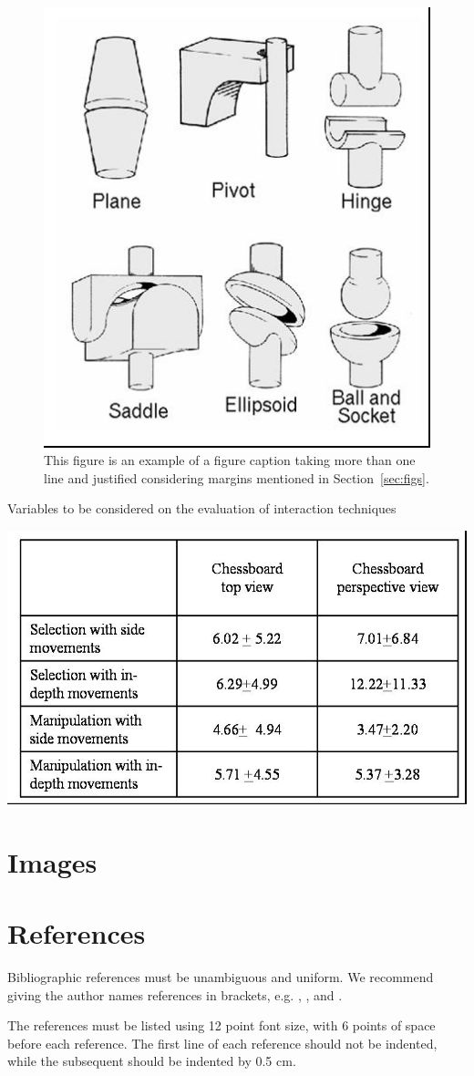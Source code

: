 \documentclass[12pt]{article}
\begin{document}
\begin{figure}[ht]
\centering
\includegraphics[width=.3\textwidth]{fig2.jpg}
\caption{This figure is an example of a figure caption taking more than one
  line and justified considering margins mentioned in Section~\ref{sec:figs}.}
\label{fig:exampleFig2}
\end{figure}



\begin{table}[ht]
\centering
\caption{Variables to be considered on the evaluation of interaction
  techniques}
\label{tab:exTable1}
\includegraphics[width=.7\textwidth]{table.jpg}
\end{table}

\section{Images}



\section{References}

Bibliographic references must be unambiguous and uniform.  We recommend giving
the author names references in brackets, e.g. \cite{knuth:84},
\cite{boulic:91}, and \cite{smith:99}.

The references must be listed using 12 point font size, with 6 points of space
before each reference. The first line of each reference should not be
indented, while the subsequent should be indented by 0.5 cm.



\end{document}
